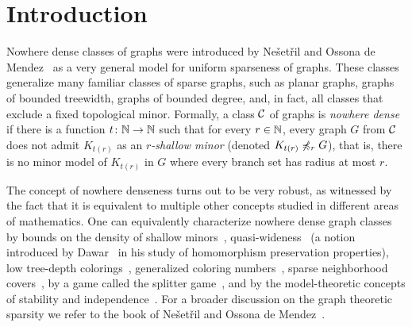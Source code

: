 \section{Introduction}\label{sec:intro}

Nowhere dense classes of graphs were introduced 
by Ne\v set\v ril and Ossona de 
Mendez~\cite{nevsetvril2010first,nevsetvril2011nowhere} as a very 
general model
for uniform sparseness of graphs. These classes generalize many 
familiar classes of sparse graphs, such as planar graphs, graphs 
of bounded treewidth,  graphs of bounded degree, and, in fact, 
all classes that exclude a fixed 
topological minor.
Formally, a class $\mathcal{C}$ of graphs is {\em{nowhere dense}} if there is a function $t\colon \mathbb{N}\to \mathbb{N}$ such that for every $r\in \mathbb{N}$, every graph $G$ from $\mathcal{C}$ does not admit $K_{t(r)}$ as an {\em{$r$-shallow minor}}
(denoted $K_{t(r)}\not\preccurlyeq_r G$),
that is, there is no minor model of $K_{t(r)}$ in $G$ where every branch set has radius at most $r$.

The concept of nowhere denseness
turns out to be very robust, as witnessed by the fact that it is equivalent 
to multiple other concepts studied in different areas of mathematics. 
One can equivalently characterize nowhere dense graph classes 
by bounds on the density of shallow 
minors~\cite{nevsetvril2010first,nevsetvril2011nowhere},
quasi-wideness~\cite{nevsetvril2011nowhere} (a notion introduced by
Dawar~\cite{dawar2010homomorphism} in his study of homomorphism
preservation properties), low tree-depth
colorings~\cite{nevsetvril2008grad}, generalized coloring
numbers~\cite{zhu2009coloring}, sparse neighborhood
covers~\cite{GroheKRSS15,grohe2014deciding}, by a game called the
splitter game~\cite{grohe2014deciding}, and by the model-theoretic
concepts of stability and independence~\cite{adler2014interpreting}.
For a broader discussion on the graph theoretic sparsity we refer to the book
of Ne\v{s}et\v{r}il and Ossona de Mendez~\cite{sparsity}.

